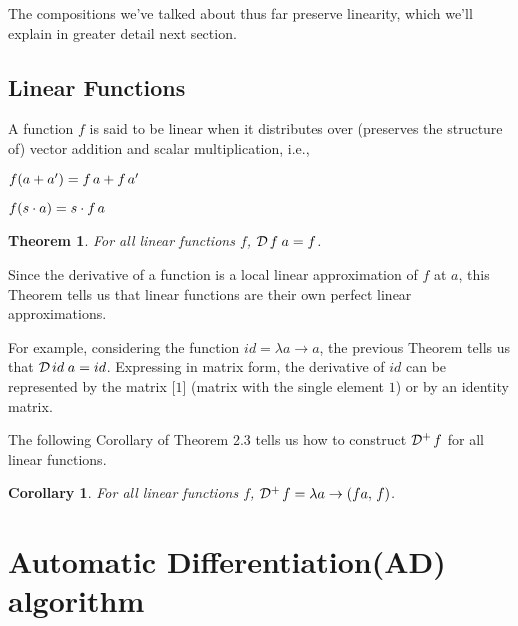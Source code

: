 \documentclass[11pt,a4]{article}
\newtheorem{teor}{Theorem}[section]
\newtheorem{coro}{Corollary}[section]
\theoremstyle{definition}
\theoremstyle{Definition}
\theoremstyle{Definition}
\begin{document}
	The compositions we've talked about thus far preserve linearity, which we'll explain  in greater detail next section. 
	
	\subsection{Linear Functions}
	A function $f$ is said to be linear when it distributes over (preserves the structure of) vector addition
	and scalar multiplication, i.e.,
	
	\quad $f(a + a')= f \hspace{0.5mm} a + f \hspace{0.5mm} a'$
	
	\quad $f(s \cdot a)= s \cdot f \hspace{0.5mm} a$
	
	\begin{teor}
		For all linear functions $f$, $\mathcal{D} \hspace{0.5mm} f \hspace{0.9mm} a = f $.
	\end{teor}
	
	Since the derivative of a function is a local linear approximation of $f$ at $a$, this Theorem tells us that linear functions are their own perfect linear approximations.
	
	For example, considering the function $id =  \lambda a \to a $, the previous Theorem tells us that $\mathcal{D} \hspace{0.5mm} id \hspace{0.9mm} a = id $. Expressing in matrix form, the derivative of $id$ can be represented by the matrix [$1$] (matrix with the single element $1$) or by an identity matrix.
	
	The following Corollary of Theorem 2.3 tells us how to construct $\mathcal{D}^{+} \hspace{0.5mm} f$ for all linear functions.
	
	\begin{coro}
		For all linear functions $f$, $\mathcal{D}^{+} \hspace{0.5mm} f = \lambda a \to (fa,\hspace{0.5mm} f)$.
	\end{coro}

	
	
	
	
	
	\newpage
    
    \section{Automatic Differentiation(AD) algorithm}
\end{document}
